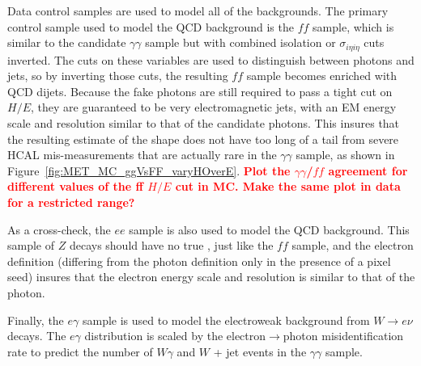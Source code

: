\documentclass[dissertation.tex]{subfiles}
\begin{document}
Data control samples are used to model all of the backgrounds.  The primary control sample used to model the QCD background is the $\mathit{ff}$ sample, which is similar to the candidate $\gamma\gamma$ sample but with combined isolation or $\sigma_{i\eta i\eta}$ cuts inverted.  The cuts on these variables are used to distinguish between photons and jets, so by inverting those cuts, the resulting $\mathit{ff}$ sample becomes enriched with QCD dijets.  Because the fake photons are still required to pass a tight cut on $H/E$, they are guaranteed to be very electromagnetic jets, with an EM energy scale and resolution similar to that of the candidate photons.  This insures that the resulting estimate of the \MET shape does not have too long of a tail from severe HCAL mis-measurements that are actually rare in the $\gamma\gamma$ sample, as shown in Figure~\ref{fig:MET_MC_ggVsFF_varyHOverE}.  \textcolor{red}{\textbf{Plot the $\gamma\gamma$/$\mathit{ff}$ \MET agreement for different values of the ff $H/E$ cut in MC.  Make the same plot in data for a restricted \MET range?}}


As a cross-check, the $ee$ sample is also used to model the QCD background.  This sample of $Z$ decays should have no true \MET, just like the $\mathit{ff}$ sample, and the electron definition (differing from the photon definition only in the presence of a pixel seed) insures that the electron energy scale and resolution is similar to that of the photon.

Finally, the $e\gamma$ sample is used to model the electroweak background from $W\rightarrow e\nu$ decays.  The $e\gamma$ \MET distribution is scaled by the electron$\rightarrow$photon misidentification rate to predict the number of $W\gamma$ and $W$ + jet events in the $\gamma\gamma$ sample.
\end{document}
